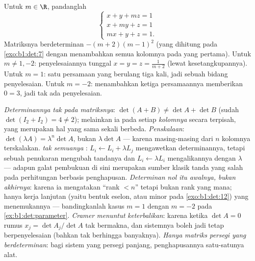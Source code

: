 \begin{example}\label{ex:b1:det:parameter}
Untuk $m \in \R$, pandanglah
\[
\begin{cases}
x + y + mz = 1\\
x + my + z = 1\\
mx + y + z = 1 .
\end{cases}
\]
Matriksnya berdeterminan $-(m+2)(m-1)^2$ (yang dihitung pada
\cref{exo:b1:det:7} dengan menambahkan semua kolomnya pada yang pertama). Untuk $m
\neq 1, -2$:
penyelesaiannya tunggal $x = y = z = \frac{1}{m+2}$ (lewat kesetangkupannya). Untuk $m =
1$: satu persamaan yang berulang tiga kali, jadi sebuah bidang penyelesaian. Untuk $m =
-2$: menambahkan ketiga persamaannya memberikan $0 = 3$, jadi tak ada penyelesaian.
\end{example}

\begin{remark}
\label{rem:b1:det:pitfalls}
\emph{Determinannya tak  pada matriksnya}: $\det(A + B)
\neq \det A + \det B$ (sudah $\det(I_2 + I_2) = 4 \neq 2$); melainkan ia
 pada setiap \emph{kolomnya} secara terpisah, yang merupakan hal yang sama sekali
berbeda.
\emph{Penskalaan}: $\det(\lambda A) = \lambda^n\det A$, bukan
$\lambda\det A$ --- karena masing-masing dari $n$ kolomnya terskalakan.
\emph{ tak semuanya }: $L_i \leftarrow L_i +
\lambda L_j$ mengawetkan determinannya, tetapi sebuah penukaran mengubah
tandanya dan $L_i \leftarrow \lambda L_i$ mengalikannya dengan $\lambda$
--- adapun galat pembukuan di sini merupakan sumber klasik tanda
yang salah pada perhitungan berbasis penghapusan.
\emph{Determinan nol itu awalnya, bukan akhirnya}: karena ia mengatakan
``rank $< n$'' tetapi bukan rank yang mana; hanya kerja lanjutan (yaitu bentuk
eselon, atau minor pada \cref{exo:b1:det:12}) yang menemukannya --- bandingkanlah
kasus $m = 1$ dengan $m = -2$ pada \cref{ex:b1:det:parameter}.
\emph{Cramer menuntut keterbalikan}: karena ketika $\det A = 0$
rumus $x_j = \det A_j/\det A$ tak bermakna, dan sistemnya
boleh jadi tetap berpenyelesaian (bahkan tak berhingga banyaknya).
\emph{Hanya matriks persegi yang berdeterminan}: bagi sistem yang
persegi panjang, penghapusannya satu-satunya alat.
\end{remark}

